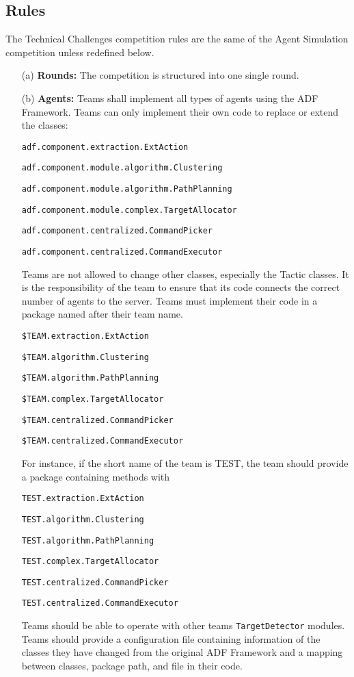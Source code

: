 \documentclass{article}
\begin{document}
\subsection{Rules}
The Technical Challenges competition rules are the same of the Agent Simulation 
competition unless redefined below.
\begin{itemize}
\item[(a)] \textbf{Rounds:} The competition is structured into one single round.
\item[(b)] \textbf{Agents:} Teams shall implement all types of agents using the 
ADF Framework. Teams can only implement their own code to replace or extend the 
classes:

\footnotesize
\texttt{adf.component.extraction.ExtAction}

\texttt{adf.component.module.algorithm.Clustering}

\texttt{adf.component.module.algorithm.PathPlanning}

\texttt{adf.component.module.complex.TargetAllocator}

\texttt{adf.component.centralized.CommandPicker}

\texttt{adf.component.centralized.CommandExecutor}

\normalsize
Teams are not allowed to change other classes, especially the Tactic classes. 
It is the responsibility of the team to ensure that its code connects the 
correct number of agents to the server. Teams must implement their code in a 
package named after their team name.

\small
\texttt{\$TEAM.extraction.ExtAction}

\texttt{\$TEAM.algorithm.Clustering}

\texttt{\$TEAM.algorithm.PathPlanning}

\texttt{\$TEAM.complex.TargetAllocator}

\texttt{\$TEAM.centralized.CommandPicker}

\texttt{\$TEAM.centralized.CommandExecutor}

\normalsize
For instance, if the short name of the team is TEST, the team should provide a 
package containing methods with

\small
\texttt{TEST.extraction.ExtAction}

\texttt{TEST.algorithm.Clustering}

\texttt{TEST.algorithm.PathPlanning}

\texttt{TEST.complex.TargetAllocator}

\texttt{TEST.centralized.CommandPicker}

\texttt{TEST.centralized.CommandExecutor}

\normalsize
Teams should be able to operate with other teams \texttt{TargetDetector} 
modules. Teams should provide a configuration file containing information of 
the classes they have changed from the original ADF Framework and a mapping 
between classes, package path, and file in their code.
\end{itemize}
\end{document}

